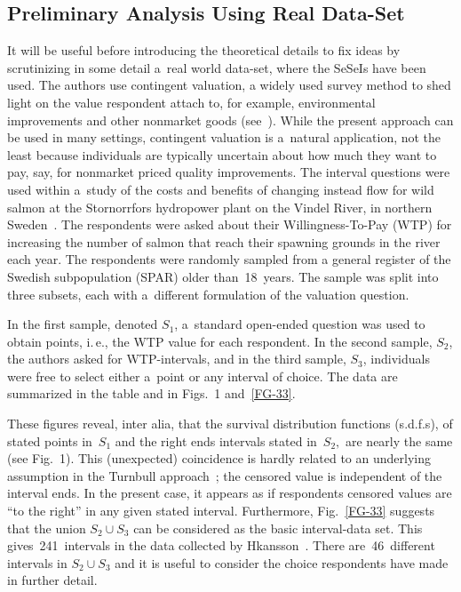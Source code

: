 \begin{multicols}{2}
\section{Preliminary Analysis Using Real Data-Set} %

\noindent
It will be useful before introducing the theoretical details to fix ideas by scrutinizing in some
detail a~real world data-set, where the SeSeIs have been used. 
The authors use contingent valuation,
a widely used survey method to shed light on the value respondent attach to,
for example, environmental
improvements and other nonmarket goods (see~\cite{BK:CA12}). While 
the present approach can be used
in many settings, contingent valuation is a~natural application, not the least because individuals are
typically uncertain about how much they want to pay, say, for nonmarket priced quality improvements.
The interval questions were used within a~study of  the costs and
benefits of changing instead flow for wild salmon at the
Stornorrfors hydropower plant on the Vindel River, in northern
Sweden~\cite{BK:HA08}. 
The respondents were asked about their Willingness-To-Pay (WTP)
for increasing the number of salmon that reach their spawning
grounds in the river each year. The respondents were randomly sampled  from a
general register of the Swedish subpopulation (SPAR) older than~18~years. 
The sample was split into three subsets, each with a~different formulation 
of the valuation question.



In the first sample, denoted $S_1$, a~standard open-ended question was used to
obtain points, i.\,e., the WTP value for each respondent. In the second sample, 
$S_2$, the authors asked for
WTP-intervals, and in the third sample, $S_3$, individuals were free to select either a~point or any interval of choice.
The data are summarized in the table and in Figs.~1 and~\ref{FG-33}.


These figures reveal, inter alia,  that the survival distribution functions (s.d.f.s), of sta\-ted
points in~$S_1$ and the right ends intervals stated 
in~$S_2,$ are nearly the same (see Fig.~1). This (unexpected) coincidence is hardly  related to
an underlying assumption in the Turnbull approach~\cite{BK:TU74, BK:TU76}; the censored value is independent
of the interval ends. In the present case, it appears as if respondents censored values are 
``to the right'' in any given stated interval.  Furthermore,  Fig.~\ref{FG-33} 
suggests that the union
$S_2 \cup S_3$ can be considered as the basic interval-data set. 
This gives~241~intervals in the data collected by\linebreak
\mbox{H{\hspace*{-1.1mm}\fontsize{12pt}{12pt}\selectfont{}}kansson}~\cite{BK:HA08}. 
There are~46~different intervals in $S_2 \cup S_3$ and it is useful to consider
the choice respondents have made in further detail.
{\small
\begin{center}


\end{center}}
\end{multicols}
